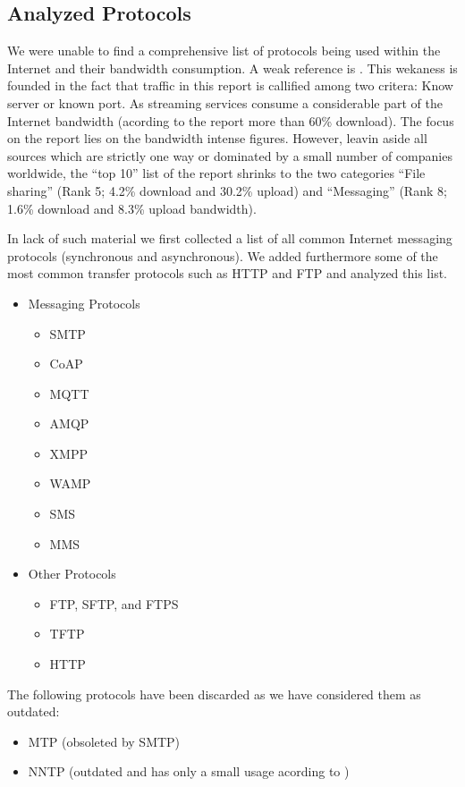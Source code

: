 \documentclass[a4paper,appendixprefix,pdfusetitle,twocolumn,fontsize=8pt,DIV=calc,8pt,draft]{\doctype} %
\begin{document}
\subsection{Analyzed Protocols}
We were unable to find a comprehensive list of protocols being used within the Internet and their bandwidth consumption. A weak reference is \cite{zhou2011examining}. This wekaness is founded in the fact that traffic in this report is callified among two critera: Know server or known port. As streaming services consume a considerable part of the Internet bandwidth (acording to the report more than 60\% download). The focus on the report lies on the bandwidth intense figures. However, leavin aside all sources which are strictly one way or dominated by a small number of companies worldwide, the ``top 10'' list of the report shrinks to the two categories ``File sharing'' (Rank 5; 4.2\% download and 30.2\% upload) and ``Messaging'' (Rank 8; 1.6\% download and 8.3\% upload bandwidth). 

In lack of such material we first collected a list of all common Internet messaging protocols (synchronous and asynchronous). We added furthermore some of the most common transfer protocols such as HTTP and FTP and analyzed this list.

\begin{itemize}
	\item Messaging Protocols
	\begin{itemize}
		\item SMTP
		\item CoAP
		\item MQTT
		\item AMQP
		\item XMPP
		\item WAMP
		\item SMS
		\item MMS
	\end{itemize}
	\item Other Protocols
	\begin{itemize}
		\item FTP, SFTP, and FTPS
		\item TFTP
		\item HTTP
	\end{itemize}
\end{itemize}

The following protocols have been discarded as we have considered them as outdated:
\begin{itemize}
	\item MTP\cite{RFC780} (obsoleted by SMTP)
	\item NNTP\cite{RFC3977} (outdated and has only a small usage acording to \cite{kim2010today})
\end{itemize}
\end{document}
